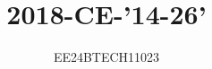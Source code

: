 \documentclass[journal,12pt,onecolumn]{IEEEtran}
\theoremstyle{remark}
\begin{document}

\vspace{3cm}
\title{2018-CE-'14-26'}
\author{EE24BTECH11023}
{\let\newpage\relax\maketitle}

\renewcommand{\thefigure}{\theenumi}
\renewcommand{\thetable}{\theenumi}
\setlength{\intextsep}{10pt} %


\renewcommand{\thetable}{\theenumi}
\end{document}
